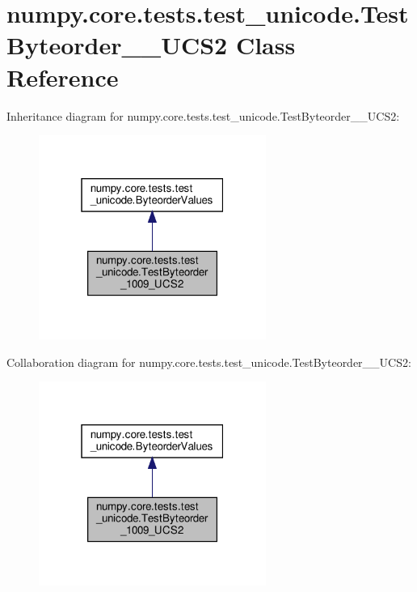 \hypertarget{classnumpy_1_1core_1_1tests_1_1test__unicode_1_1TestByteorder__1009__UCS2}{}\section{numpy.\+core.\+tests.\+test\+\_\+unicode.\+Test\+Byteorder\+\_\+\_\+\+U\+C\+S2 Class Reference}
\label{classnumpy_1_1core_1_1tests_1_1test__unicode_1_1TestByteorder__1009__UCS2}


Inheritance diagram for numpy.\+core.\+tests.\+test\+\_\+unicode.\+Test\+Byteorder\+\_\+\_\+\+U\+C\+S2\+:
\nopagebreak
\begin{figure}[H]
\begin{center}
\leavevmode
\includegraphics[width=211pt]{classnumpy_1_1core_1_1tests_1_1test__unicode_1_1TestByteorder__1009__UCS2__inherit__graph}
\end{center}
\end{figure}


Collaboration diagram for numpy.\+core.\+tests.\+test\+\_\+unicode.\+Test\+Byteorder\+\_\+\_\+\+U\+C\+S2\+:
\nopagebreak
\begin{figure}[H]
\begin{center}
\leavevmode
\includegraphics[width=211pt]{classnumpy_1_1core_1_1tests_1_1test__unicode_1_1TestByteorder__1009__UCS2__coll__graph}
\end{center}
\end{figure}
